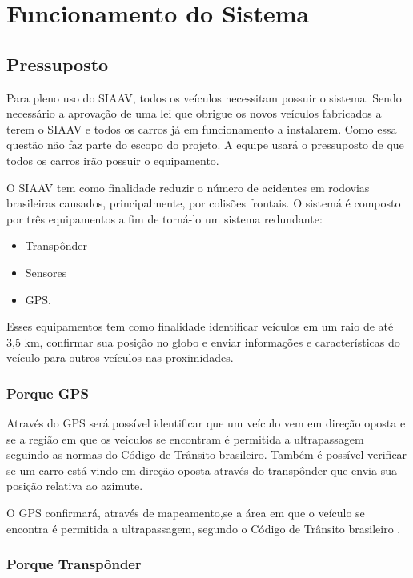 \chapter[Funcionamento do Sistema]{Funcionamento do Sistema}

\section{Pressuposto}

Para pleno uso do SIAAV, todos os veículos necessitam possuir o sistema. Sendo necessário a aprovação de uma lei que obrigue os novos veículos fabricados a terem o SIAAV e todos os carros já em funcionamento a instalarem. Como essa questão não faz parte do escopo do projeto. A equipe usará o pressuposto de que todos os carros irão possuir o equipamento.

O SIAAV tem como finalidade reduzir o número de acidentes em rodovias brasileiras causados, principalmente, por colisões frontais.
O sistemá é composto por três equipamentos a fim de torná-lo um sistema redundante:

\begin{itemize}
  \item Transpônder
  \item Sensores
  \item GPS.
\end{itemize}

Esses equipamentos  tem como finalidade identificar veículos em um raio de até 3,5 km, confirmar sua posição no globo e enviar informações e características do veículo para outros veículos nas proximidades.

\subsection{Porque GPS}

Através do GPS será possível identificar que um veículo vem em direção oposta e se a região em que os veículos se encontram é permitida a ultrapassagem seguindo as normas do Código de Trânsito brasileiro. Também é possível verificar  se um carro está vindo em direção oposta através do transpônder que envia sua posição relativa ao azimute.

O GPS confirmará, através de mapeamento,se a área em que o veículo se encontra é permitida a ultrapassagem, segundo o Código de Trânsito brasileiro \cite{ctb}.

\subsection{Porque Transpônder}

